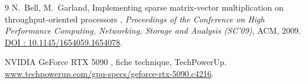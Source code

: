 \begin{thebibliography}{9}
 N.~Bell, M.~Garland, \og Implementing sparse matrix-vector multiplication on throughput-oriented processors \fg, \emph{Proceedings of the Conference on High Performance Computing, Networking, Storage and Analysis (SC'09)}, ACM, 2009. \href{https://doi.org/10.1145/1654059.1654078}{DOI : 10.1145/1654059.1654078}.

 \og NVIDIA GeForce RTX 5090 \fg, fiche technique, TechPowerUp. \href{https://www.techpowerup.com/gpu-specs/geforce-rtx-5090.c4216}{www.techpowerup.com/gpu-specs/geforce-rtx-5090.c4216}.

\end{thebibliography}
